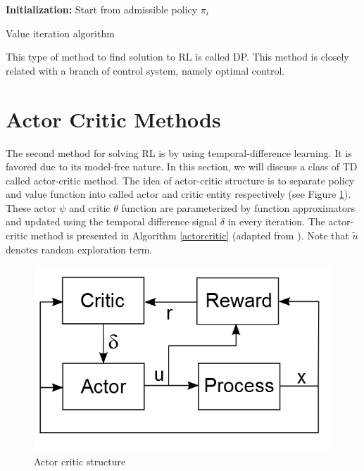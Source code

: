 \begin{algorithm}[H]
	\textbf{Initialization:} Start from admissible policy $ \pi_{i} $\\
	\label{algorithm2}
	\caption{Value iteration algorithm}
\end{algorithm}

This type of method to find solution to \ac{RL} is called \ac{DP}. This method is closely related with a branch of control system, namely optimal control.
 
\section{Actor Critic Methods} \label{sec:actor}
The second method for solving \ac{RL} is by using temporal-difference learning. It is favored due to its model-free nature. In this section, we will discuss a class of \ac{TD} called actor-critic method. The idea of actor-critic structure is to separate policy and value function into called actor and critic entity respectively (see Figure \ref{fig:actorCritic}). These actor $\psi$ and critic $\theta$ function are parameterized by function approximators and updated using the temporal difference signal $\delta$ in every iteration. The actor-critic method is presented in Algorithm \ref{actorcritic} (adapted from \cite{babuskaRL}). Note that $\tilde{u}$ denotes random exploration term.

\begin{figure}[h!]
\centering
\includegraphics[width=0.6\linewidth]{actorCritic2}
\caption{Actor critic structure} 
\label{fig:actorCritic}
\end{figure}

